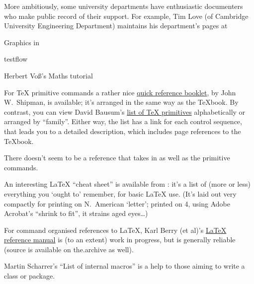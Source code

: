 More ambitiously, some university departments have enthusiastic
documenters who 
make public record of their \AllTeX{} support.  For example, Tim Love
(of Cambridge University Engineering Department) maintains his
department's pages at
\begin{ctanrefs}
\item[\nothtml{\rmfamily}Graphics in \LaTeXe{}]
\item[testflow]
\item[\nothtml{\rmfamily}Herbert Vo\ss {}'s Maths tutorial]
\end{ctanrefs}


For \TeX{} primitive commands a rather nice %
\href{http://www.nmt.edu/tcc/help/pubs/texcrib.pdf}{quick reference booklet},
by John W.~Shipman, is available; it's arranged in the same way as the
\TeX{}book.  By contrast, you can view David Bausum's %
\href{http://www.tug.org/utilities/plain/cseq.html}{list of \TeX{} primitives}
alphabetically or arranged by ``family''.  Either way, the list has a
link for each control sequence, that leads you to a detailed
description, which includes page references to the \TeX{}book.

There doesn't seem to be a reference that takes in \plaintex{} as
well as the primitive commands.

An interesting \LaTeX{} ``cheat sheet'' is available from :
it's a list of (more or less) everything you `ought to' remember, for
basic \LaTeX{} use. %
(It's laid out very compactly for printing on N.\ American `letter';
printed on  4, using Adobe Acrobat's ``shrink to
fit'', it strains aged eyes\dots{}) 

For command organised references to \LaTeX{},  Karl Berry (et
al)'s %
\href{http://home.gna.org/latexrefman}{LaTeX reference manual} is (to
an extent) work in progress, but is generally reliable (source is
available on the.archive as well).

Martin Scharrer's ``List of internal \latex{} macros'' is a help to
those aiming to write a class or package.

